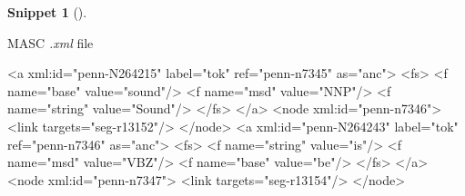 \documentclass[
  letterpaper,
  krantz1]{latex/krantz-mod}
\newenvironment{Shaded}{\begin{snugshade}}{\end{snugshade}}
\newcommand{\KeywordTok}[1]{\textcolor[rgb]{0.00,0.00,0.00}{#1}}
\newcommand{\NormalTok}[1]{\textcolor[rgb]{0.00,0.00,0.00}{#1}}
\newcommand{\OtherTok}[1]{\textcolor[rgb]{0.00,0.00,0.00}{#1}}
\newcommand{\StringTok}[1]{\textcolor[rgb]{0.00,0.00,0.00}{#1}}
\theoremstyle{definition}
\newtheorem{definition}{Snippet}[chapter]
\theoremstyle{definition}
\theoremstyle{remark}
\begin{document}
\begin{definition}[]\protect\hypertarget{def-masc-xml}{}\label{def-masc-xml}

MASC \emph{.xml} file

\begin{Shaded}
\begin{Highlighting}[]
\NormalTok{\textless{}}\KeywordTok{a}\OtherTok{ xml:id=}\StringTok{"penn{-}N264215"}\OtherTok{ label=}\StringTok{"tok"}\OtherTok{ ref=}\StringTok{"penn{-}n7345"}\OtherTok{ as=}\StringTok{"anc"}\NormalTok{\textgreater{}}
\NormalTok{  \textless{}}\KeywordTok{fs}\NormalTok{\textgreater{}}
\NormalTok{    \textless{}}\KeywordTok{f}\OtherTok{ name=}\StringTok{"base"}\OtherTok{ value=}\StringTok{"sound"}\NormalTok{/\textgreater{}}
\NormalTok{    \textless{}}\KeywordTok{f}\OtherTok{ name=}\StringTok{"msd"}\OtherTok{ value=}\StringTok{"NNP"}\NormalTok{/\textgreater{}}
\NormalTok{    \textless{}}\KeywordTok{f}\OtherTok{ name=}\StringTok{"string"}\OtherTok{ value=}\StringTok{"Sound"}\NormalTok{/\textgreater{}}
\NormalTok{  \textless{}/}\KeywordTok{fs}\NormalTok{\textgreater{}}
\NormalTok{\textless{}/}\KeywordTok{a}\NormalTok{\textgreater{}}
\NormalTok{\textless{}}\KeywordTok{node}\OtherTok{ xml:id=}\StringTok{"penn{-}n7346"}\NormalTok{\textgreater{}}
\NormalTok{  \textless{}}\KeywordTok{link}\OtherTok{ targets=}\StringTok{"seg{-}r13152"}\NormalTok{/\textgreater{}}
\NormalTok{\textless{}/}\KeywordTok{node}\NormalTok{\textgreater{}}
\NormalTok{\textless{}}\KeywordTok{a}\OtherTok{ xml:id=}\StringTok{"penn{-}N264243"}\OtherTok{ label=}\StringTok{"tok"}\OtherTok{ ref=}\StringTok{"penn{-}n7346"}\OtherTok{ as=}\StringTok{"anc"}\NormalTok{\textgreater{}}
\NormalTok{  \textless{}}\KeywordTok{fs}\NormalTok{\textgreater{}}
\NormalTok{    \textless{}}\KeywordTok{f}\OtherTok{ name=}\StringTok{"string"}\OtherTok{ value=}\StringTok{"is"}\NormalTok{/\textgreater{}}
\NormalTok{    \textless{}}\KeywordTok{f}\OtherTok{ name=}\StringTok{"msd"}\OtherTok{ value=}\StringTok{"VBZ"}\NormalTok{/\textgreater{}}
\NormalTok{    \textless{}}\KeywordTok{f}\OtherTok{ name=}\StringTok{"base"}\OtherTok{ value=}\StringTok{"be"}\NormalTok{/\textgreater{}}
\NormalTok{  \textless{}/}\KeywordTok{fs}\NormalTok{\textgreater{}}
\NormalTok{\textless{}/}\KeywordTok{a}\NormalTok{\textgreater{}}
\NormalTok{\textless{}}\KeywordTok{node}\OtherTok{ xml:id=}\StringTok{"penn{-}n7347"}\NormalTok{\textgreater{}}
\NormalTok{  \textless{}}\KeywordTok{link}\OtherTok{ targets=}\StringTok{"seg{-}r13154"}\NormalTok{/\textgreater{}}
\NormalTok{\textless{}/}\KeywordTok{node}\NormalTok{\textgreater{}}
\end{Highlighting}
\end{Shaded}

\end{definition}
\end{document}
